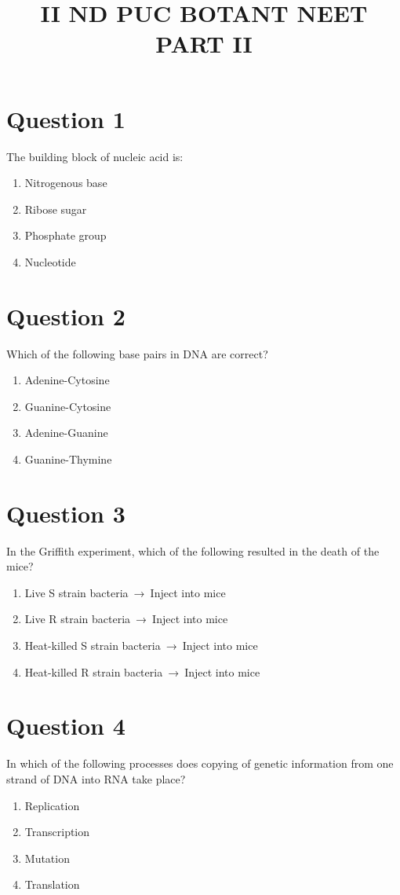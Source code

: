 \documentclass{article}
\title{ II ND PUC BOTANT NEET PART II}
\begin{document}
                    \maketitle
                    \section*{Question 1}
The building block of nucleic acid is:
\begin{enumerate}[label=(\alph*)]
\item Nitrogenous base
\item Ribose sugar
\item Phosphate group
\item Nucleotide
\end{enumerate}
\newpage
\section*{Question 2}
Which of the following base pairs in DNA are correct?
\begin{enumerate}[label=(\alph*)]
\item Adenine-Cytosine
\item Guanine-Cytosine
\item Adenine-Guanine
\item Guanine-Thymine
\end{enumerate}
\newpage
\section*{Question 3}
In the Griffith experiment, which of the following resulted in the death of the mice?
\begin{enumerate}[label=(\alph*)]
\item Live S strain bacteria → Inject into mice
\item Live R strain bacteria → Inject into mice
\item Heat-killed S strain bacteria → Inject into mice
\item Heat-killed R strain bacteria → Inject into mice
\end{enumerate}
\newpage
\section*{Question 4}
In which of the following processes does copying of genetic information from one strand of DNA into RNA take place?
\begin{enumerate}[label=(\alph*)]
\item Replication
\item Transcription
\item Mutation
\item Translation
\end{enumerate}
\newpage
\end{document}
